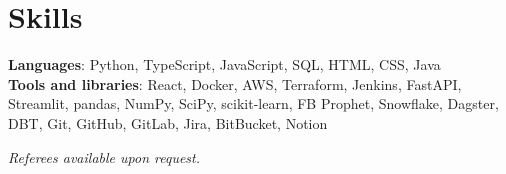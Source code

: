 \documentclass[a4paper,11pt]{article}
\begin{document}
\section{Skills}
\begin{itemize}[leftmargin=0.15in, label={}]
  \small{\item{
        \textbf{Languages}{:
          Python,
          TypeScript,
          JavaScript,
          SQL,
          HTML,
          CSS,
          Java
        } \\
        \textbf{Tools and libraries}{:
          React,
          Docker,
          AWS,
          Terraform,
          Jenkins,
          FastAPI,
          Streamlit,
          pandas,
          NumPy,
          SciPy,
          scikit-learn,
          FB Prophet,
          Snowflake,
          Dagster,
          DBT,
          Git,
          GitHub,
          GitLab,
          Jira,
          BitBucket,
          Notion
        } \\
        }}
\end{itemize}

\begin{center}
  \small \textit{Referees available upon request.}
\end{center}

\end{document}
